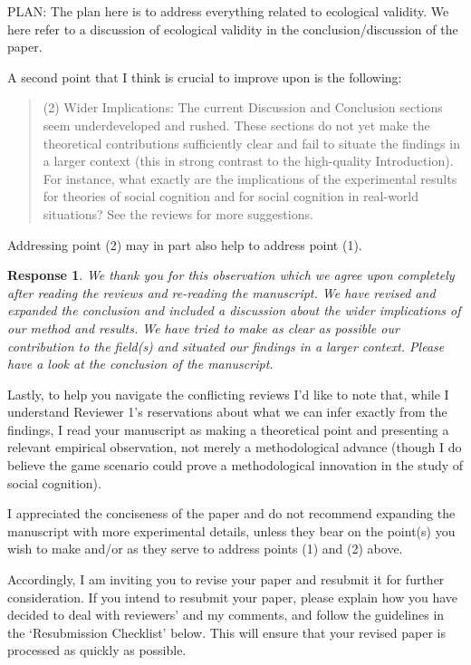 \documentclass[a4paper]{article}
\newtheorem{response}{Response}
\newenvironment{robin}{\smallskip \noindent \color{red!10!green!50!blue}}{\color{black}\smallskip}
\begin{document}
\begin{robin}
PLAN: The plan here is to address everything related to ecological validity. We here refer to a discussion of ecological validity in the conclusion/discussion of the paper. 

\end{robin} 


A second point that I think is crucial to improve upon is the following:
\begin{quote}
(2)    Wider Implications: The current Discussion and Conclusion sections seem underdeveloped and rushed. These sections do not yet make the theoretical contributions sufficiently clear and fail to situate the findings in a larger context (this in strong contrast to the high-quality Introduction). For instance, what exactly are the implications of the experimental results for theories of social cognition and for social cognition in real-world situations? See the reviews for more suggestions.
\end{quote}
Addressing point (2) may in part also help to address point (1). 

\begin{response}We thank you for this observation which we agree upon completely after reading the reviews and re-reading the manuscript. We have revised and expanded the conclusion and included a discussion about the wider implications of our method and results. We have tried to make as clear as possible our contribution to the field(s) and situated our findings in a larger context. Please have a look at the conclusion of the manuscript. 
\end{response}

Lastly, to help you navigate the conflicting reviews I’d like to note that, while I understand Reviewer 1’s reservations about what we can infer exactly from the findings, I read your manuscript as making a theoretical point and presenting a relevant empirical observation, not merely a methodological advance (though I do believe the game scenario could prove a methodological innovation in the study of social cognition). 


I appreciated the conciseness of the paper and do not recommend expanding the manuscript with more experimental details, unless they bear on the point(s) you wish to make and/or as they serve to address points (1) and (2) above. 

Accordingly, I am inviting you to revise your paper and resubmit it for further consideration. If you intend to resubmit your paper, please explain how you have decided to deal with reviewers’ and my comments, and follow the guidelines in the ‘Resubmission Checklist’ below. This will ensure that your revised paper is processed as quickly as possible. 
\end{document}
